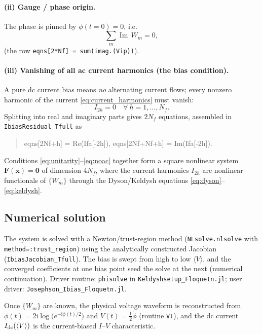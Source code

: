 \documentclass[11pt,a4paper]{article}
\newcommand{\ii}{\mathrm{i}}
\newcommand{\Imag}{\operatorname{Im}}
\newcommand{\half}{\tfrac{1}{2}}
\begin{document}
\paragraph{(ii) Gauge / phase origin.}
The phase is pinned by $\phi(t{=}0)=0$, i.e.
\begin{equation}
  \sum_m \Imag\,W_m = 0,
  \label{eq:gauge_fix}
\end{equation}
(the row \texttt{eqns[2*Nf] = sum(imag.(Vip))}).

\paragraph{(iii) Vanishing of all ac current harmonics (the bias condition).}
A pure dc current bias means \emph{no} alternating current flows; every nonzero
harmonic of the current \eqref{eq:current_harmonics} must vanish:
\begin{equation}
  I_{2h} = 0 \quad\forall\ h=1,\dots,N_f.
  \label{eq:noac}
\end{equation}
Splitting into real and imaginary parts gives $2N_f$ equations, assembled in
\texttt{IbiasResidual\_Tfull} as
\begin{quote}
\ttfamily
eqns[2Nf+h] = Re(Ifa[-2h]), \quad eqns[2Nf+Nf+h] = Im(Ifa[-2h]).
\end{quote}

Conditions \eqref{eq:unitarity}--\eqref{eq:noac} together form a square
nonlinear system $\mathbf{F}(\mathbf{x})=\mathbf{0}$ of dimension $4N_f$, where
the current harmonics $I_{2h}$ are nonlinear functionals of $\{W_m\}$ through
the Dyson/Keldysh equations \eqref{eq:dyson}--\eqref{eq:keldysh}.

\subsection{Numerical solution}

The system is solved with a Newton/trust-region method (\texttt{NLsolve.nlsolve}
with \texttt{method=:trust\_region}) using the analytically constructed
Jacobian (\texttt{IbiasJacobian\_Tfull}).  The bias is swept from high to low
$\langle V\rangle$, and the converged coefficients at one bias point seed the
solve at the next (numerical continuation).  Driver routine: \texttt{phisolve}
in \texttt{Keldyshsetup\_Floquetn.jl}; user driver:
\texttt{Josephson\_Ibias\_Floquetn.jl}.

Once $\{W_m\}$ are known, the physical voltage waveform is reconstructed from
$\phi(t)=2\ii\log\!\big(e^{-\ii\phi(t)/2}\big)$ and $V(t)=\half\dot\phi$
(routine \texttt{Vt}), and the dc current $I_{\rm dc}(\langle V\rangle)$ is the
current-biased $I$--$V$ characteristic.
\end{document}
